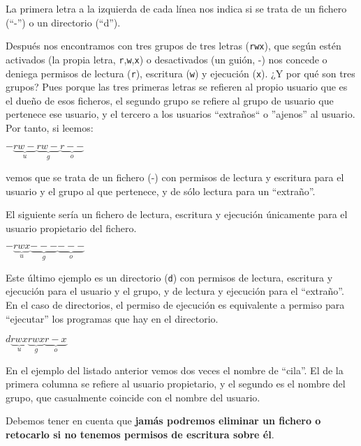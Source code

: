 La primera letra a  la izquierda de cada línea nos  indica si se trata
de un fichero (``-'') o un directorio (``d'').

Después nos  encontramos con tres  grupos de tres letras  ({\tt rwx}),
que según estén activados (la propia letra, {\tt r},{\tt w},{\tt x}) o
desactivados (un guión,  -) nos concede o deniega  permisos de lectura
({\tt r}), escritura  ({\tt w}) y ejecución ({\tt x}).  ¿Y por qué son
tres  grupos? Pues  porque las  tres  primeras letras  se refieren  al
propio usuario que  es el dueño de esos ficheros,  el segundo grupo se
refiere al grupo de usuario que  pertenece ese usuario, y el tercero a
los  usuarios ``extraños``  o  ''ajenos'' al  usuario.  Por tanto,  si
leemos:

\begin{center}
$-\underbrace{rw-}_{u}\underbrace{rw-}_{g}\underbrace{r--}_{o}$
\end{center}

\noindent vemos que se trata de un fichero (-) con permisos de lectura
y escritura  para el usuario  y el grupo al  que pertenece, y  de sólo
lectura para un ``extraño''.

El  siguiente  sería un  fichero  de  lectura, escritura  y  ejecución
únicamente para el usuario pro\-pie\-ta\-rio del fichero.

\begin{center}
$-\underbrace{rwx}_{u}\underbrace{---}_{g}\underbrace{---}_{o}$
\end{center}

Este  último  ejemplo es  un  directorio  ({\tt  d}) con  permisos  de
lectura,  escritura y  ejecución  para el  usuario y  el  grupo, y  de
lectura y ejecución para el ``extraño''. En el caso de directorios, el
permiso de  ejecución es equivalente  a permiso para  ``ejecutar'' los
programas que hay en el directorio.

\begin{center}
$d\underbrace{rwx}_{u}\underbrace{rwx}_{g}\underbrace{r-x}_{o}$
\end{center}

En  el ejemplo  del  listado anterior  vemos dos  veces  el nombre  de
``cila''. El de la primera columna se refiere al usuario propietario,
y el segundo  es el nombre del grupo, que  casualmente coincide con el
nombre  del usuario.

\begin{nota}
Debemos tener en cuenta que {\bf  jamás podremos eliminar un fichero o
retocarlo  si no  tenemos permisos  de  escritura sobre  él}.
\end{nota}

